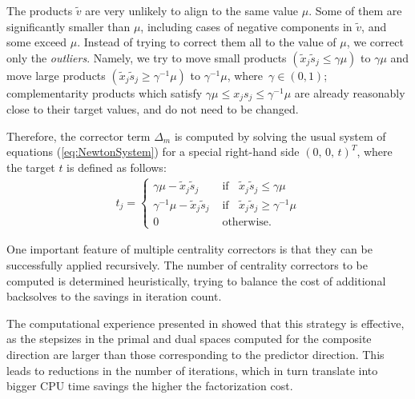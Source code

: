 The products $\tilde v$ are very unlikely to align to the same value $\mu$.
Some of them are significantly smaller than $\mu$, 
including cases of negative components in $\tilde v$, 
and some exceed $\mu$. Instead of trying to correct 
them all to the value of $\mu$, we correct only the {\it outliers}. 
Namely, we try to move small products 
$(\tilde x_j \tilde s_j \leq \gamma \mu)$ to $\gamma \mu$ and move 
large products $(\tilde x_j \tilde s_j \geq \gamma^{-1} \mu)$ 
to $\gamma^{-1} \mu$, where $\, \gamma \in (0,1)$;
complementarity products 
which satisfy $\gamma \mu \leq x_j s_j \leq \gamma^{-1} \mu$ are
already reasonably close to their target values, and 
do not need to be changed. 


Therefore, the corrector term $\Delta_m$ is computed by solving the usual 
system of equations (\ref{eq:NewtonSystem}) for a special right-hand side
$(0, \,0,\, t)^T$, where the target $t$ is defined as follows:
%
\begin{eqnarray} \label{eq:Target}
  t_j = \left\{
  \begin{array}{ll}
    \gamma \mu - \tilde x_j \tilde s_j  
    & \mbox{ if } \;\; \tilde x_j \tilde s_j \leq \gamma \mu  \\
    \gamma^{-1} \mu - \tilde x_j \tilde s_j  
    & \mbox{ if } \;\; \tilde x_j \tilde s_j \geq \gamma^{-1} \mu  \\
    0    
    & \mbox{ otherwise.}
  \end{array}
  \right.
\end{eqnarray}


One important feature of multiple centrality correctors is that they
can be successfully applied recursively. 
The number of centrality correctors to be computed is determined 
heuristically, trying to balance the cost of additional backsolves to 
the savings in iteration count.


The computational experience presented in \cite{Gondzio96} showed 
that this strategy is effective, as the stepsizes in the primal and 
dual spaces computed for the composite direction are larger than 
those corresponding to the predictor direction. 
This leads to reductions in the number of iterations, which in turn 
translate into bigger CPU time savings the higher the factorization
cost.


